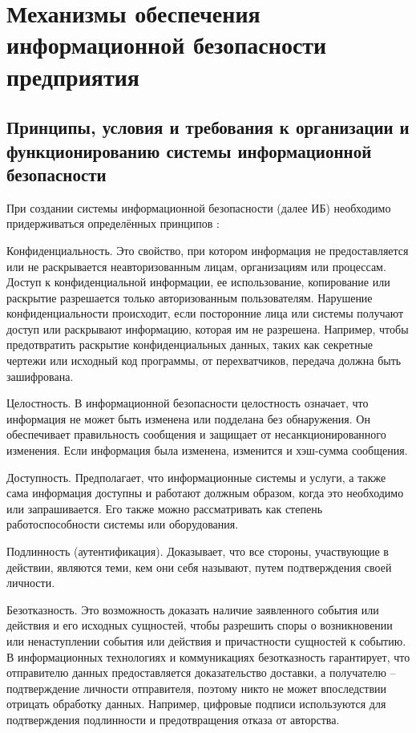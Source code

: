
\section{Механизмы обеспечения информационной безопасности предприятия}
\label{sec:mechanisms}

\subsection{Принципы, условия и требования к организации и функционированию системы информационной безопасности}
\label{subsec:mechanisms:principles}

При создании системы информационной безопасности (далее ИБ)
необходимо придерживаться определённых принципов \cite{vasilkov}:

Конфиденциальность. Это свойство, при котором информация не
предоставляется или не раскрывается неавторизованным лицам, организациям
или процессам. Доступ к конфиденциальной информации, ее использование,
копирование или раскрытие разрешается только авторизованным
пользователям. Нарушение конфиденциальности происходит, если
посторонние лица или системы получают доступ или раскрывают
информацию, которая им не разрешена. Например, чтобы предотвратить
раскрытие конфиденциальных данных, таких как секретные чертежи или исходный код программы,
от перехватчиков, передача должна быть зашифрована.

Целостность. В информационной безопасности целостность
означает, что информация не может быть изменена или подделана без
обнаружения. Он обеспечивает правильность сообщения и защищает от
несанкционированного изменения. Если информация была изменена,
изменится и хэш-сумма сообщения.

Доступность. Предполагает, что информационные системы и
услуги, а также сама информация доступны и работают должным образом,
когда это необходимо или запрашивается. Его также можно рассматривать как
степень работоспособности системы или оборудования.

Подлинность (аутентификация). Доказывает, что все стороны, участвующие в действии, являются теми, кем они себя называют, путем подтверждения своей личности.

Безотказность. Это возможность доказать наличие заявленного
события или действия и его исходных сущностей, чтобы разрешить споры о
возникновении или ненаступлении события или действия и причастности
сущностей к событию. В информационных технологиях и коммуникациях
безотказность гарантирует, что отправителю данных предоставляется
доказательство доставки, а получателю – подтверждение личности
отправителя, поэтому никто не может впоследствии отрицать обработку
данных. Например, цифровые подписи используются для подтверждения
подлинности и предотвращения отказа от авторства.

